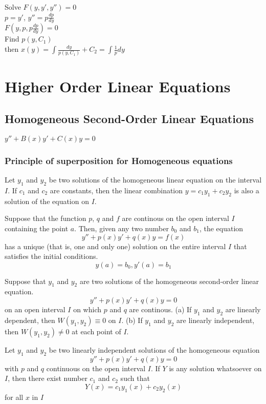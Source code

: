 \documentclass[letter]{article}
\begin{document}
Solve $F(y,y',y'') =0$\\
$p=y'$, $y''=p\frac{dp}{dy}$\\

$F(y,p,p\frac{dp}{dy}) = 0$\\
Find $p(y,C_1)$\\
then $x(y) = \int{\frac{dy}{p(y,C_1)} + C_2} = \int{\frac{1}{p}dy}$\\

\section{Higher Order Linear Equations}
\subsection{Homogeneous Second-Order Linear Equations}
$y'' + B(x)y'+C(x)y = 0$\\

\subsubsection{Principle of superposition for Homogeneous equations}
Let $y_1$ and $y_2$ be two solutions of the homogeneous linear equation on the interval $I$. If $c_1$ and $c_2$ are constants, then the linear combination $y=c_1y_1 + c_2y_2$ is also a solution of the equation on $I$.

\begin{thm}
Suppose that the function $p$, $q$ and $f$ are continous on the open interval $I$ containing the point $a$. Then, given any two number $b_0$ and $b_1$, the equation
\[
y''+p(x)y' + q(x)y = f(x)
\]
has a unique (that is, one and only one) solution on the entire interval $I$ that satisfies the initial conditions.
\[
y(a) = b_0, y'(a) =b_1
\]
\end{thm}

\begin{thm}
Suppose that $y_1$ and $y_2$ are two solutions of the homogeneous second-order linear equation.
\[
y'' + p(x)y' + q(x)y = 0
\]
on an open interval $I$ on which $p$ and $q$ are continous.
(a) If $y_1$ and $y_2$ are linearly dependent, then $W(y_1,y_2) \equiv 0$ on $I$.
(b) If $y_1$ and $y_2$ are linearly independent, then $W(y_1, y_2) \neq 0$ at each point of $I$.
\end{thm}


\begin{thm}
Let $y_1$ and $y_2$ be two linearly independent solutions of the homogeneous equation
\[
y'' + p(x)y' + 	q(x)y=0
\]
with $p$ and $q$ continuous on the open interval $I$. If $Y$ is any solution whatsoever on $I$, then there exist number $c_1$ and $c_2$ such that
\[
Y(x) = c_1y_1(x) + c_2y_2(x)
\]
for all $x$ in $I$
\end{thm}
\end{document}
